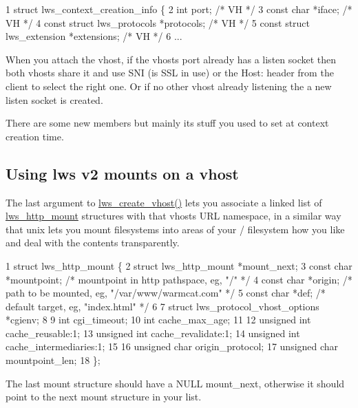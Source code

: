 \begin{DoxyCode}
1 struct lws\_context\_creation\_info \{
2         int port;                                       /* VH */
3         const char *iface;                              /* VH */
4         const struct lws\_protocols *protocols;          /* VH */
5         const struct lws\_extension *extensions;         /* VH */
6 ...
\end{DoxyCode}


When you attach the vhost, if the vhost\textquotesingle{}s port already has a listen socket then both vhosts share it and use S\+NI (is S\+SL in use) or the Host\+: header from the client to select the right one. Or if no other vhost already listening the a new listen socket is created.

There are some new members but mainly it\textquotesingle{}s stuff you used to set at context creation time.

\subsection*{Using lws v2 mounts on a vhost }

The last argument to \hyperlink{group__context-and-vhost_ga0c54c667ccd9b8b3dddcd123ca72f87c}{lws\+\_\+create\+\_\+vhost()} lets you associate a linked list of \hyperlink{structlws__http__mount}{lws\+\_\+http\+\_\+mount} structures with that vhost\textquotesingle{}s U\+RL \textquotesingle{}namespace\textquotesingle{}, in a similar way that unix lets you mount filesystems into areas of your / filesystem how you like and deal with the contents transparently.


\begin{DoxyCode}
1 struct lws\_http\_mount \{
2         struct lws\_http\_mount *mount\_next;
3         const char *mountpoint; /* mountpoint in http pathspace, eg, "/" */
4         const char *origin; /* path to be mounted, eg, "/var/www/warmcat.com" */
5         const char *def; /* default target, eg, "index.html" */
6 
7         struct lws\_protocol\_vhost\_options *cgienv;
8 
9         int cgi\_timeout;
10         int cache\_max\_age;
11 
12         unsigned int cache\_reusable:1;
13         unsigned int cache\_revalidate:1;
14         unsigned int cache\_intermediaries:1;
15 
16         unsigned char origin\_protocol;
17         unsigned char mountpoint\_len;
18 \};
\end{DoxyCode}


The last mount structure should have a N\+U\+LL mount\+\_\+next, otherwise it should point to the \textquotesingle{}next\textquotesingle{} mount structure in your list.

